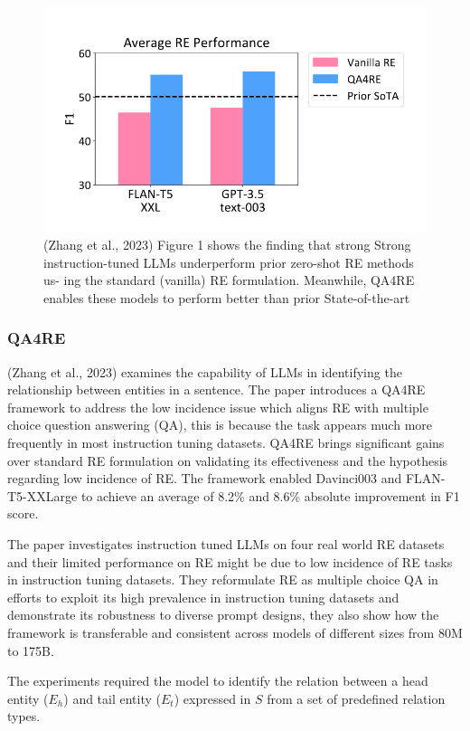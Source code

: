 \documentclass[twocolumn, 11pt]{extarticle}
\begin{document}
\begin{figure}
    \centering
    \includegraphics[width=1\linewidth]{RAG4RE_results.png}
    \caption{(Zhang et al., 2023) Figure 1 shows the finding that strong Strong instruction-tuned
LLMs underperform prior zero-shot RE methods us-
ing the standard (vanilla) RE formulation. Meanwhile, QA4RE enables these models to perform better than prior State-of-the-art }
    \label{RAG4RE Results}
\end{figure}
\subsubsection{QA4RE}
(Zhang et al., 2023) examines the capability of LLMs in identifying the relationship between entities in a sentence. The paper introduces a QA4RE framework to address the low incidence issue which aligns RE with multiple choice question answering (QA), this is because the task appears much more frequently in most instruction tuning datasets. 
QA4RE brings significant gains over standard RE formulation on validating its effectiveness and the hypothesis regarding low incidence of RE. The framework enabled Davinci003 and FLAN-T5-XXLarge to achieve an average of 8.2\% and 8.6\% absolute improvement in F1 score. 

The paper investigates instruction tuned LLMs on four real world RE datasets and their limited performance on RE might be due to low incidence of RE tasks in instruction tuning datasets. They reformulate RE as multiple choice QA in efforts to exploit its high prevalence in instruction tuning datasets and demonstrate its robustness to diverse prompt designs, they also show how the framework is transferable and consistent across models of different sizes from 80M to 175B. 

The experiments required the model to identify the relation between a head entity ($E_h$) and tail entity ($E_t$) expressed in $S$ from a set of predefined relation types. 
\end{document}
